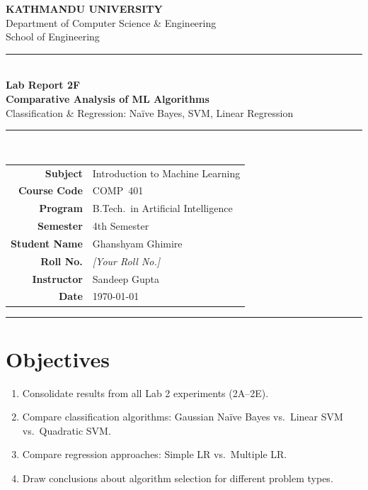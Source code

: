 \documentclass[12pt,a4paper]{article}
\begin{document}
\begin{center}
  {\Large\bfseries\color{kuBlue} KATHMANDU UNIVERSITY}\\[4pt]
  {\normalsize Department of Computer Science \& Engineering}\\[2pt]
  {\normalsize School of Engineering}\\[10pt]
  \rule{\linewidth}{1.5pt}\\[6pt]
  {\large\bfseries Lab Report 2F}\\[4pt]
  {\LARGE\bfseries Comparative Analysis of ML Algorithms}\\[4pt]
  {\large Classification \& Regression: Naïve Bayes, SVM, Linear Regression}\\[4pt]
  \rule{\linewidth}{0.8pt}\\[10pt]
\end{center}

\begin{center}
\renewcommand{\arraystretch}{1.4}
\begin{tabular}{r l}
  \textbf{Subject}      & Introduction to Machine Learning \\
  \textbf{Course Code}  & COMP~401 \\
  \textbf{Program}      & B.Tech.\ in Artificial Intelligence \\
  \textbf{Semester}     & 4th Semester \\
  \textbf{Student Name} & Ghanshyam Ghimire \\
  \textbf{Roll No.}     & \textit{[Your Roll No.]} \\
  \textbf{Instructor}   & Sandeep Gupta \\
  \textbf{Date}         & \today \\
\end{tabular}
\end{center}
\vspace{10pt}\hrule\vspace{16pt}

\section{Objectives}
\begin{enumerate}[label=\arabic*.]
  \item Consolidate results from all Lab 2 experiments (2A--2E).
  \item Compare classification algorithms: Gaussian Naïve Bayes vs.\ Linear SVM vs.\ Quadratic SVM.
  \item Compare regression approaches: Simple LR vs.\ Multiple LR.
  \item Draw conclusions about algorithm selection for different problem types.
\end{enumerate}
\end{document}
